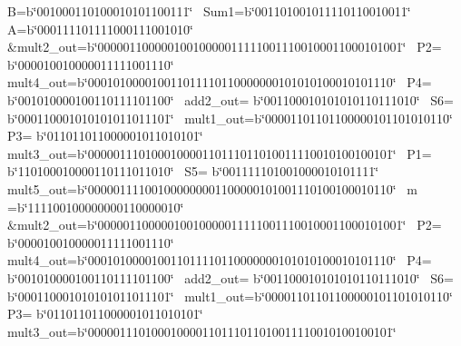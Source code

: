 \begin{longtabu}
 B=b\char`\"{}001000110100010101100111\char`\"{}~\newline
 Sum1=b\char`\"{}001101001011110110010011\char`\"{}~\newline
 A=b\char`\"{}000111101111000111001010\char`\"{}  &\PBS\raggedleft mult2\+\_\+out=b\char`\"{}000001100000100100000111110011100100011000101001\char`\"{}~\newline
 P2= b\char`\"{}000010010000011111001110\char`\"{}~\newline
 mult4\+\_\+out=b\char`\"{}000101000010011011110110000000101010100010101110\char`\"{}~\newline
 P4= b\char`\"{}001010000100110111101100\char`\"{}~\newline
 add2\+\_\+out= b\char`\"{}001100010101010110111010\char`\"{}~\newline
 S6= b\char`\"{}000110001010101011011101\char`\"{}~\newline
 mult1\+\_\+out=b\char`\"{}00001101101100000101101010110\char`\"{}~\newline
 P3= b\char`\"{}011011011000001011010101\char`\"{}~\newline
 mult3\+\_\+out=b\char`\"{}000001110100010000110111011010011110010100100101\char`\"{}~\newline
 P1= b\char`\"{}110100010000110111011010\char`\"{}~\newline
 S5= b\char`\"{}001111101001000010101111\char`\"{}~\newline
 mult5\+\_\+out=b\char`\"{}000001111001000000001100000101001110100100010110\char`\"{}~\newline
 m =b\char`\"{}111100100000000110000010\char`\"{}  &\PBS\raggedleft mult2\+\_\+out=b\char`\"{}000001100000100100000111110011100100011000101001\char`\"{}~\newline
 P2= b\char`\"{}000010010000011111001110\char`\"{}~\newline
 mult4\+\_\+out=b\char`\"{}000101000010011011110110000000101010100010101110\char`\"{}~\newline
 P4= b\char`\"{}001010000100110111101100\char`\"{}~\newline
 add2\+\_\+out= b\char`\"{}001100010101010110111010\char`\"{}~\newline
 S6= b\char`\"{}000110001010101011011101\char`\"{}~\newline
 mult1\+\_\+out=b\char`\"{}00001101101100000101101010110\char`\"{}~\newline
 P3= b\char`\"{}011011011000001011010101\char`\"{}~\newline
 mult3\+\_\+out=b\char`\"{}000001110100010000110111011010011110010100100101\char`\"{}~\newline

\end{longtabu}
